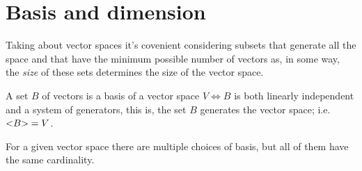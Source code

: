 



\section{Basis and dimension}
Taking about vector spaces it's covenient considering subsets that generate all the space and that have
the minimum possible number of vectors as, in some way, the \textit{size} of these sets determines the size
of the vector space.

\begin{defi}[Basis]
    A set $B$ of vectors is a basis of a vector space $V\iff B$ is both linearly independent and a system of
    generators, this is, the set $B$ generates the vector space; i.e. $\mathopen{<} B \mathclose{>} = V$.
\end{defi}

\begin{remark}
    For a given vector space there are multiple choices of basis, but all of them have the same cardinality.
\end{remark}

